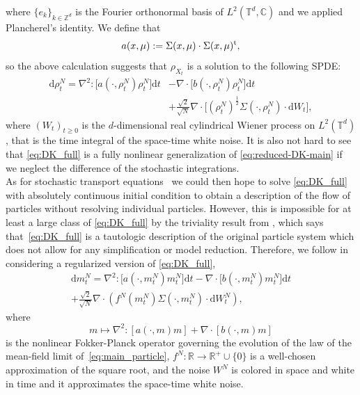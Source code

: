 where $\{e_k\}_{k \in \mathbb{Z}^d}$ is the Fourier orthonormal basis of $L^2(\mathbb{T}^d, \mathbb{C})$ and we applied Plancherel's identity. We define that
\begin{equation*}
    a(x,\mu) := \Sigma(x,\mu) \cdot \Sigma(x,\mu)^{\operatorname{t}},
\end{equation*}
so the above calculation suggests that $\rho_{X_t}$ is a solution to the following SPDE:
\begin{equation}\label{eq:DK_full}
\begin{split}
\mathrm{d}\rho^N_t =  \nabla^2 : \big[a(\cdot, \rho^N_t) \rho^N_t\big]\mathrm{d}t & - \nabla \cdot \big[ b(\cdot, \rho^N_t) \rho^N_t \big]\mathrm{d}t\\ & + \frac{\sqrt{2}}{\sqrt{N}}\nabla \cdot\big[(\rho^N_t)^{\frac{1}{2}} \Sigma (\cdot, \rho^N_t) \cdot \mathrm{d}W_t\big],
\end{split}
\end{equation}
where $(W_t)_{t \geq 0}$ is the $d$-dimensional real cylindrical Wiener process on $L^2(\mathbb{T}^d)$, that is the time integral of the space-time white noise. It is also not hard to see that \eqref{eq:DK_full} is a fully nonlinear generalization of \eqref{eq:reduced-DK-main} if we neglect the difference of the stochastic integrations.\\

As for stochastic transport equations~\cite{Kunita1990} we could then hope to solve \eqref{eq:DK_full} with absolutely continuous initial condition to obtain a description of the flow of particles without resolving individual particles.  However, this is impossible for at least a large class of \eqref{eq:DK_full} by the triviality result from \cite{KLvR19,KLvR20}, which says that~\eqref{eq:DK_full} is a tautologic description of the original particle system which does not allow for any simplification or model reduction. Therefore, we follow \cite{FG21,DKP23} in considering a regularized version of \eqref{eq:DK_full}, 
\begin{equation}\label{eq:DK_reg-intro}
\begin{split}
    \mathrm{d}m^N_t = \nabla^2: \big[a(\cdot, m^N_t) m^N_t\big]\mathrm{d}t - \nabla \cdot \big[ b(\cdot, m^N_t)m^N_t \big]\mathrm{d}t \\ + \frac{\sqrt{2}}{\sqrt{N}}\nabla \cdot (f^N(m^N_t) \Sigma (\cdot, m^N_t) \cdot \mathrm{d}W^N_t),
\end{split}
\end{equation}
where
$$
m \mapsto \nabla^2 :[ a(\cdot, m)m] + \nabla \cdot [ b(\cdot, m)m]
$$
is the nonlinear Fokker-Planck operator governing the evolution of the law of the mean-field limit of~\eqref{eq:main_particle}, $f^N: \mathbb{R} \to \mathbb{R}^+ \cup \{0\}$ is a well-chosen approximation of the square root, and the noise $W^N$ is colored in space and white in time and it approximates the space-time white noise.


